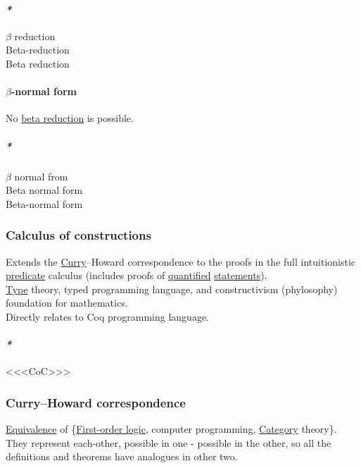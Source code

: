 \documentclass[11pt]{article}
\begin{document}
\paragraph{\emph{*}}
\label{sec:orgaacbd00}

\label{org9149933}\(\beta\) reduction\\
\label{org7f5398b}Beta-reduction\\
\label{orgb158a69}Beta reduction\\

\paragraph{\label{org9ba4658}\(\beta\)-normal form}
\label{sec:org04897ce}
No \hyperref[orgb158a69]{beta reduction} is possible.\\

\subparagraph{\emph{*}}
\label{sec:org9139dc7}

\label{orge94126c}\(\beta\) normal from\\
\label{org3f1f13a}Beta normal form\\
\label{org7f6d9b3}Beta-normal form\\

\subsubsection{\label{org3ab98a2}Calculus of constructions}
\label{sec:orge26ca1e}
Extends the \hyperref[org44f1752]{Curry}–Howard correspondence to the proofs in the full intuitionistic \hyperref[orgf52abe4]{predicate} calculus (includes proofs of \hyperref[org8d67434]{quantified} \hyperref[org3a604a1]{statements}).\\
\hyperref[org4fbaeb8]{Type} theory, typed programming language, and constructivism (phylosophy) foundation for mathematics.\\
Directly relates to Coq programming language.\\

\paragraph{\emph{*}}
\label{sec:org8876f48}

<<<\label{org617855d}CoC>>>\\

\subsubsection{\label{orgded9b6e}Curry–Howard correspondence}
\label{sec:org94a9fe4}
\hyperref[orgad1fc87]{Equivalence} of \{\hyperref[orgc8d3455]{First-order logic}, computer programming, \hyperref[org3e3a79b]{Category} theory\}. They represent each-other, possible in one - possible in the other, so all the definitions and theorems have analogues in other two.\\
\end{document}
